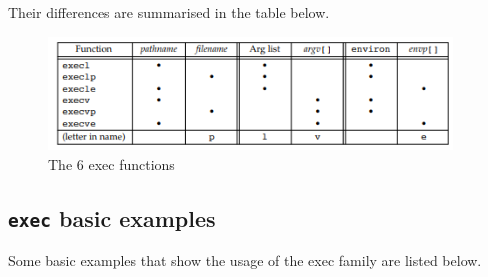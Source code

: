 \documentclass[a4paper]{article}
\begin{document}
Their differences are summarised in the table below.
\begin{figure}[H]
    \centering
    \includegraphics[height=3cm]{img/exec_family_table.png}
    \caption{The 6 exec functions}
\end{figure}

\subsection{\texttt{exec} basic examples}


Some basic examples that show the usage of  the exec family are listed below.


\end{document}
